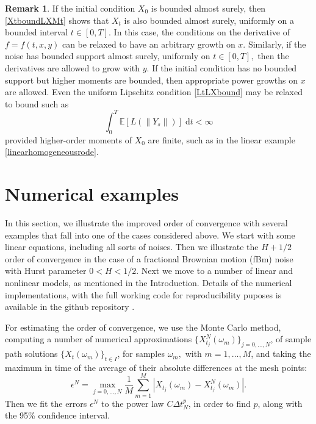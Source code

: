 \documentclass[reqno,12pt]{amsart}
\theoremstyle{plain} %
\theoremstyle{definition} %
\newtheorem{remark}{Remark}[section]
\begin{document}
\begin{remark}
    If the initial condition $X_0$ is bounded almost surely, then \eqref{XtboundLXMt} shows that $X_t$ is also bounded almost surely, uniformly on a bounded interval $t\in [0, T].$ In this case, the conditions on the derivative of $f=f(t, x, y)$ can be relaxed to have an arbitrary growth on $x$. Similarly, if the noise has bounded support almost surely, uniformly on $t\in [0, T],$ then the derivatives are allowed to grow with $y$. If the initial condition has no bounded support but higher moments are bounded, then appropriate power growths on $x$ are allowed. Even the uniform Lipschitz condition \eqref{LtLXbound} may be relaxed to bound such as
    \[
        \int_0^T \mathbb{E}[L(\|Y_s\|)] \;\mathrm{d}t < \infty
    \]
    provided higher-order moments of $X_0$ are finite, such as in the linear example \eqref{linearhomogeneousrode}.
\end{remark}

\section{Numerical examples}
\label{secnumericalexamples}

In this section, we illustrate the improved order of convergence with several examples that fall into one of the cases considered above. We start with some linear equations, including all sorts of noises. Then we illustrate the $H + 1/2$ order of convergence in the case of a fractional Brownian motion (fBm) noise with Hurst parameter $0 < H < 1/2$. Next we move to a number of linear and nonlinear models, as mentioned in the Introduction. Details of the numerical implementations, with the full working code for reproducibility puposes is available in the github repository \cite{RODEConvEM2023}.

For estimating the order of convergence, we use the Monte Carlo method, computing a number of numerical approximations $\{X_{t_j}^N(\omega_m)\}_{j=0, \ldots, N}$, of sample path solutions $\{X_t(\omega_m)\}_{t\in I}$, for samples $\omega_m,$ with $m = 1, \ldots, M$, and taking the maximum in time of the average of their absolute differences at the mesh points:
\begin{equation}
    \epsilon^N = \max_{j=0, \ldots, N} \frac{1}{M}\sum_{m=1}^M \left|X_{t_j}(\omega_m) - X_{t_j}^N(\omega_m)\right|.
\end{equation}
Then we fit the errors $\epsilon^N$ to the power law $C\Delta t_N^p$, in order to find $p$, along with the 95\% confidence interval.
\end{document}
